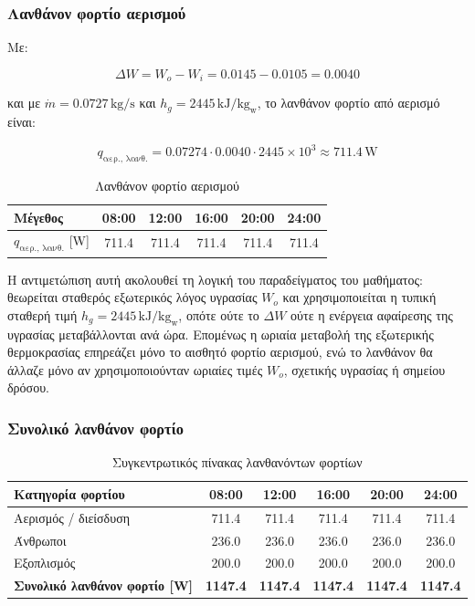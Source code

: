 \documentclass[12pt,a4paper]{article}
\begin{document}
\subsubsection{Λανθάνον φορτίο αερισμού}

Με:

\[
\Delta W = W_o - W_i = 0.0145 - 0.0105 = 0.0040
\]

και με \(\dot m = 0.0727\,\mathrm{kg/s}\) και
\(h_g = 2445\,\mathrm{kJ/kg_w}\), το λανθάνον φορτίο από αερισμό είναι:

\[
q_{\text{αερ., λανθ.}} =
0.07274 \cdot 0.0040 \cdot 2445 \times 10^3
\approx 711.4\,\mathrm{W}
\]

\begin{table}[H]
\centering
\caption{Λανθάνον φορτίο αερισμού}
\begin{tabular}{lccccc}
\toprule
\textbf{Μέγεθος} & \textbf{08:00} & \textbf{12:00} & \textbf{16:00} & \textbf{20:00} & \textbf{24:00} \\
\midrule
\(q_{\text{αερ., λανθ.}}\) [W] & 711.4 & 711.4 & 711.4 & 711.4 & 711.4 \\
\bottomrule
\end{tabular}
\end{table}

Η αντιμετώπιση αυτή ακολουθεί τη λογική του παραδείγματος του μαθήματος: θεωρείται
σταθερός εξωτερικός λόγος υγρασίας \(W_o\) και χρησιμοποιείται η τυπική σταθερή τιμή
\(h_g = 2445\,\mathrm{kJ/kg_w}\), οπότε ούτε το \(\Delta W\) ούτε η ενέργεια
αφαίρεσης της υγρασίας μεταβάλλονται ανά ώρα. Επομένως η ωριαία μεταβολή της
εξωτερικής θερμοκρασίας επηρεάζει μόνο το αισθητό φορτίο αερισμού, ενώ το λανθάνον
θα άλλαζε μόνο αν χρησιμοποιούνταν ωριαίες τιμές \(W_o\), σχετικής υγρασίας ή
σημείου δρόσου.

\subsubsection{Συνολικό λανθάνον φορτίο}

\begin{table}[H]
\centering
\caption{Συγκεντρωτικός πίνακας λανθανόντων φορτίων}
\begin{tabular}{lccccc}
\toprule
\textbf{Κατηγορία φορτίου} & \textbf{08:00} & \textbf{12:00} & \textbf{16:00} & \textbf{20:00} & \textbf{24:00} \\
\midrule
Αερισμός / διείσδυση & 711.4 & 711.4 & 711.4 & 711.4 & 711.4 \\
Άνθρωποι & 236.0 & 236.0 & 236.0 & 236.0 & 236.0 \\
Εξοπλισμός & 200.0 & 200.0 & 200.0 & 200.0 & 200.0 \\
\midrule
\textbf{Συνολικό λανθάνον φορτίο [W]} & \textbf{1147.4} & \textbf{1147.4} & \textbf{1147.4} & \textbf{1147.4} & \textbf{1147.4} \\
\bottomrule
\end{tabular}
\end{table}
\end{document}
